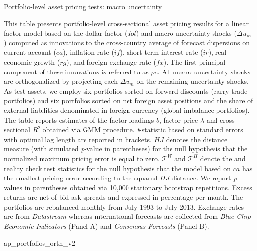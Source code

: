 \begin{landscape}
	
	\begin{table}[ht]
		\caption{Portfolio-level asset pricing tests: macro uncertainty} \label{tab:ap_portfolios_orth}
		\begin{footnotesize}
			This table presents portfolio-level cross-sectional asset pricing results for a linear factor model based on the dollar factor ($dol$) and macro uncertainty shocks ($\Delta u_{m}$) computed as innovations to the cross-country average of forecast dispersions on current account ($ca$), inflation rate ($if$), short-term interest rate ($ir$), real economic growth ($rg$), and foreign exchange rate ($fx$). The first principal component of these innovations is referred to as $pc$. All macro uncertainty shocks are orthogonalized by projecting each $\Delta u_{m}$ on the remaining uncertainty shocks. As test assets, we employ six portfolios sorted on forward discounts (carry trade portfolios) and six portfolios sorted on net foreign asset positions and the share of external liabilities denominated in foreign currency (global imbalance portfolios). The table reports estimates of the factor loadings $b$, factor price $\lambda$ and cross-sectional $R^{2}$ obtained via GMM procedure. \emph{t}-statistic based on \citet{newey_west1987} standard errors with \citet{andrews1991} optimal lag length are reported in brackets. $HJ$ denotes the \citet{hansen/jagannathan:97} distance measure (with simulated \emph{p}-value in parentheses) for the null hypothesis that the normalized maximum pricing error is equal to zero. $\mathcal{T}^W$ and $\mathcal{T}^H$ denote the \citet{white:2000} and \citet{hansen:2005} reality check test statistics for the null hypothesis that the model based on $ca$ has the smallest pricing error according to the squared $HJ$ distance. We report \emph{p}-values in parentheses obtained via 10,000 stationary bootstrap repetitions. Excess returns are net of bid-ask spreads and expressed in percentage per month. The portfolios are rebalanced monthly from July 1993 to July 2013. Exchange rates are from \textit{Datastream} whereas international forecasts are collected from \textit{Blue Chip Economic Indicators} (Panel A) and \textit{Consensus Forecasts} (Panel B).
		\end{footnotesize}
		
		{ap_portfolios_orth_v2}
	\end{table}	
	
\end{landscape}

